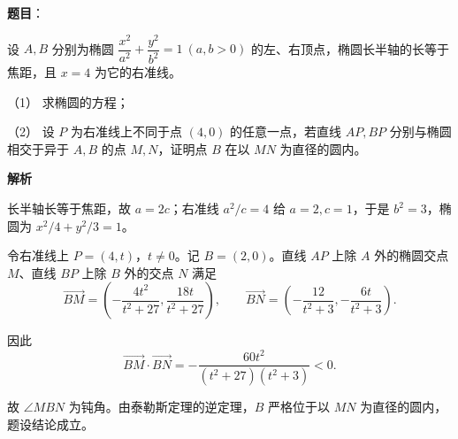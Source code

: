 \begin{answer}

\textbf{题目}：

设 $A,B$ 分别为椭圆 $\dfrac{x^2}{a^2}+\dfrac{y^2}{b^2}=1\ (a,b>0)$ 的左、右顶点，椭圆长半轴的长等于焦距，且 $x=4$ 为它的右准线。

（1） 求椭圆的方程；

（2） 设 $P$ 为右准线上不同于点 $(4,0)$ 的任意一点，若直线 $AP,BP$ 分别与椭圆相交于异于 $A,B$ 的点 $M,N$，证明点 $B$ 在以 $MN$ 为直径的圆内。

\textbf{解析}


长半轴长等于焦距，故 $a=2c$；右准线 $a^2/c=4$ 给 $a=2,c=1$，于是 $b^2=3$，椭圆为 $x^2/4+y^2/3=1$。


令右准线上 $P=(4,t)$，$t\ne0$。记 $B=(2,0)$。直线 $AP$ 上除 $A$ 外的椭圆交点 $M$、直线 $BP$ 上除 $B$ 外的交点 $N$ 满足
\nopagebreak[4]
\[
\overrightarrow{BM}=\left(-\frac{4t^2}{t^2+27},\frac{18t}{t^2+27}\right),\qquad
\overrightarrow{BN}=\left(-\frac{12}{t^2+3},-\frac{6t}{t^2+3}\right).
\]

因此
\nopagebreak[4]
\[
\overrightarrow{BM}\cdot\overrightarrow{BN}
=-\frac{60t^2}{(t^2+27)(t^2+3)}<0.
\]

故 $\angle MBN$ 为钝角。由泰勒斯定理的逆定理，$B$ 严格位于以 $MN$ 为直径的圆内，题设结论成立。



\end{answer}
